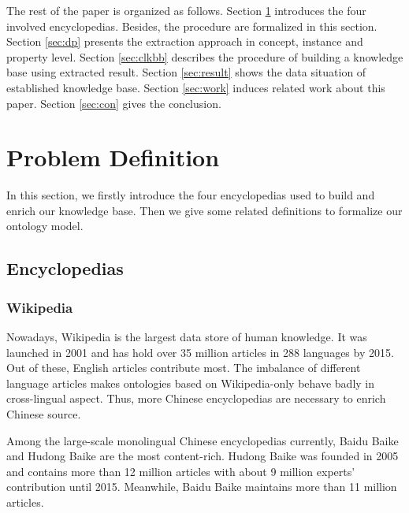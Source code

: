 \documentclass[runningheads,a4paper]{llncs}
\begin{document}
The rest of the paper is organized as follows. Section \ref{sec:pd} introduces the four involved encyclopedias. Besides, the procedure are formalized in this section. Section \ref{sec:dp} presents the extraction approach in concept, instance and property level. Section \ref{sec:clkbb} describes the procedure of building a knowledge base using extracted result. Section \ref{sec:result} shows the data situation of established knowledge base. Section \ref{sec:work} induces related work about this paper. Section \ref{sec:con} gives the conclusion.

\section{Problem Definition}
\label{sec:pd}
In this section, we firstly introduce the four encyclopedias used to build and enrich our knowledge base. Then we give some related definitions to formalize our ontology model. 

\subsection{Encyclopedias}
\label{sec:encyclopedias}
\subsubsection{Wikipedia}
Nowadays, Wikipedia is the largest data store of human knowledge. It was launched in 2001 and has hold over 35 million articles in 288 languages by 2015. Out of these, English articles contribute most. The imbalance of different language articles makes ontologies based on Wikipedia-only behave badly in cross-lingual aspect. Thus, more Chinese encyclopedias are necessary to enrich Chinese source.

Among the large-scale monolingual Chinese encyclopedias currently, Baidu Baike and Hudong Baike are the most content-rich. Hudong Baike was founded in 2005 and contains more than 12 million articles with about 9 million experts' contribution until 2015. Meanwhile, Baidu Baike maintains more than 11 million articles. 
\end{document}
